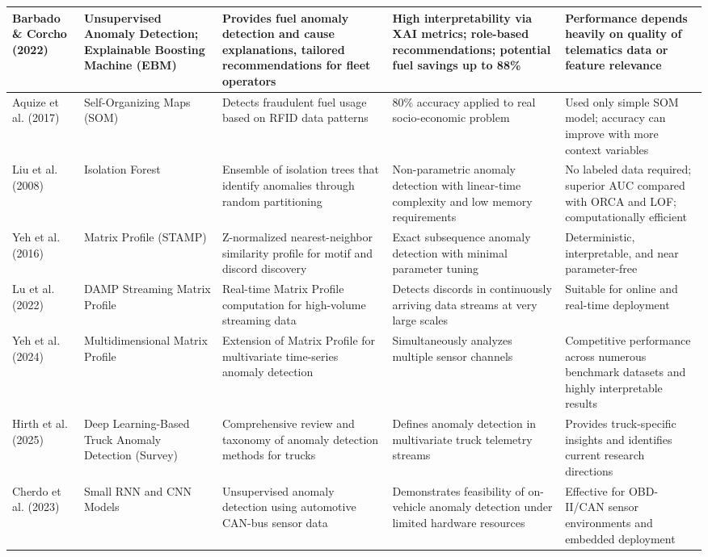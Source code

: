 {\begin{longtable}{|p{}|p{}|p{}|p{}|p{}|}
\hline
Barbado \& Corcho (2022) \cite{barbado2022interpretable} & Unsupervised Anomaly Detection; Explainable Boosting Machine (EBM) & Provides fuel anomaly detection and cause explanations, tailored recommendations for fleet operators & High interpretability via XAI metrics; role-based recommendations; potential fuel savings up to 88\% & Performance depends heavily on quality of telematics data or feature relevance \\
\hline
Aquize et al. (2017) \cite{aquize2017self} & Self-Organizing Maps (SOM) & Detects fraudulent fuel usage based on RFID data patterns & 80\% accuracy applied to real socio-economic problem & Used only simple SOM model; accuracy can improve with more context variables \\
\hline
Liu et al. (2008) \cite{liu2008isolation_forest} & Isolation Forest & Ensemble of isolation trees that identify anomalies through random partitioning & Non-parametric anomaly detection with linear-time complexity and low memory requirements & No labeled data required; superior AUC\glsadd{AUC} compared with ORCA and LOF; computationally efficient \\
\hline
Yeh et al. (2016) \cite{yeh2016matrix_profile} & Matrix Profile (STAMP\glsadd{STAMP}) & Z-normalized nearest-neighbor similarity profile for motif and discord discovery & Exact subsequence anomaly detection with minimal parameter tuning & Deterministic, interpretable, and near parameter-free \\
\hline
Lu et al. (2022) \cite{lu2022matrix_profile_xxiv} & DAMP Streaming Matrix Profile & Real-time Matrix Profile computation for high-volume streaming data & Detects discords in continuously arriving data streams at very large scales & Suitable for online and real-time deployment \\
\hline
Yeh et al. (2024) \cite{yeh2024matrix_profile_multidim} & Multidimensional Matrix Profile & Extension of Matrix Profile for multivariate time-series anomaly detection & Simultaneously analyzes multiple sensor channels & Competitive performance across numerous benchmark datasets and highly interpretable results \\
\hline
Hirth et al. (2025) \cite{hirth2025truck_survey} & Deep Learning-Based Truck Anomaly Detection (Survey) & Comprehensive review and taxonomy of anomaly detection methods for trucks & Defines anomaly detection in multivariate truck telemetry streams & Provides truck-specific insights and identifies current research directions \\
\hline
Cherdo et al. (2023) \cite{cherdo2023can_anomaly} & Small RNN and CNN Models & Unsupervised anomaly detection using automotive CAN-bus sensor data & Demonstrates feasibility of on-vehicle anomaly detection under limited hardware resources & Effective for OBD-II/CAN sensor environments and embedded deployment \\
\hline
\end{longtable}
}
\normalsize

